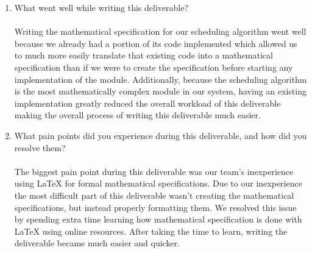 \documentclass[12pt, titlepage]{article}
\begin{document}
\begin{enumerate}
  \item What went well while writing this deliverable?\\\\
  Writing the mathematical specification for our scheduling algorithm went well
  because we already had a portion of its code implemented which allowed us to
  much more easily translate that existing code into a mathematical 
  specification than if we were to create the specification before starting
  any implementation of the module. Additionally, because the scheduling 
  algorithm is the most mathematically complex module in our system, 
  having an existing implementation greatly reduced the overall workload of 
  this deliverable making the overall process of writing this deliverable much
  easier.
    
  \item What pain points did you experience during this deliverable, and how
  did you resolve them?\\\\
  The biggest pain point during this deliverable was our team's inexperience
  using LaTeX for formal mathematical specifications. Due to our inexperience 
  the most difficult part of this deliverable wasn't creating the mathematical
  specifications, but instead properly formatting them. We resolved this issue 
  by spending extra time learning how mathematical specification is done with 
  LaTeX using online resources. After taking the time to learn, writing the 
  deliverable became much easier and quicker.
  
\end{enumerate}
\end{document}

